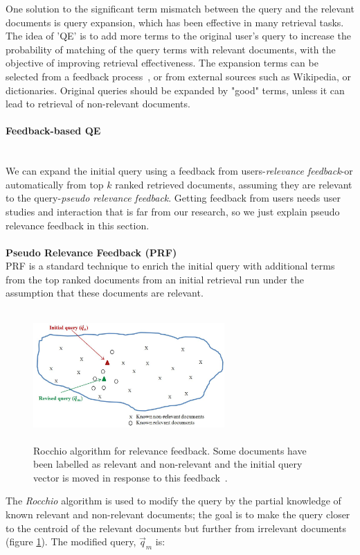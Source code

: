 One solution to the significant term mismatch between the query and the relevant documents is query expansion, which has been effective in many retrieval tasks. The idea of 'QE' is to add more terms to the original user's query to increase the probability of matching of the query terms with relevant documents, with the objective of improving retrieval effectiveness. The expansion terms can be selected from a feedback process~\citep{cao2008selecting}, or from external sources such as Wikipedia, or dictionaries. Original queries should be expanded by "good" terms, unless it can lead to retrieval of non-relevant documents.
\paragraph{Feedback-based QE}
\ \\
We can expand the initial query using a feedback from users-\textit{relevance feedback}-or automatically from top $ k $ ranked retrieved documents, assuming they are relevant to the query-\textit{pseudo relevance feedback}. Getting feedback from  users needs user studies and interaction that is far from our research, so we just explain pseudo relevance feedback in this section. \\\\
\textbf{Pseudo Relevance Feedback (PRF)} 
\ \\
PRF is a standard technique to enrich the initial query with additional terms from the top ranked documents from an initial retrieval run under the assumption that these documents are relevant.
\begin{figure}[htpb]
   \centering
   \includegraphics[width=0.65\textwidth,height=50mm]{figs/rocchio.jpg}
   \caption{Rocchio algorithm for relevance feedback. Some documents have been labelled as relevant and non-relevant and the initial query vector is moved in response to this feedback~\citep{manning2008introduction}.}  
   \label{fig:rocchio} 
\end{figure}
\FloatBarrier 
\noindent
The \textit{Rocchio} algorithm is used to modify the query by the partial knowledge of known relevant and non-relevant documents; the goal is to make the query closer to the centroid of the relevant documents but further from irrelevant documents (figure \ref{fig:rocchio}). The modified query, $ \vec{q}_m $ is:
